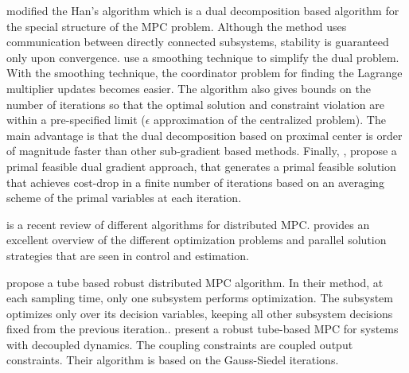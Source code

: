 \documentclass[10pt]{article}
\theoremstyle{definition}
\begin{document}
 \citet{doan:keviczky:necoara:diehl:schutter:2009} modified
the Han's algorithm which is a dual decomposition based algorithm for
the special structure of the MPC problem. Although the method uses
communication between directly connected subsystems, stability is
guaranteed only upon convergence. \citet{necoara:doan:suykens:2008}
use a smoothing technique to simplify the dual problem. With the
smoothing technique, the coordinator problem for finding the Lagrange
multiplier updates becomes easier. The algorithm also gives bounds on
the number of iterations so that the optimal solution and constraint
violation are within a pre-specified limit ($\epsilon$ approximation of
the centralized problem). The main advantage is that the dual
decomposition based on proximal center is order of magnitude faster
than other sub-gradient based methods. Finally,
\citet{doan:keviczky:schutter:2011}, propose a primal feasible dual
gradient approach, that generates a primal feasible solution  that
achieves cost-drop in a
finite number of iterations based on an averaging scheme of the primal
variables at each iteration. 

\citet{christofides:scattolini:pena:liu:2012} is a recent review of different algorithms for distributed
MPC. \citet{necoara:nedelcu:dumitrache:2011} provides an excellent overview of the different
optimization problems and parallel solution strategies that are seen
in control and estimation.

\citet{trodden:richards:2006,trodden:richards:2007} propose a tube based robust distributed
MPC algorithm. In their method, at each sampling time, only one
subsystem performs optimization. The subsystem optimizes only over its
decision variables, keeping all other subsystem decisions fixed from
the previous iteration.. \citet{richards:how:2004} present a robust tube-based
MPC for systems with decoupled dynamics. The coupling constraints are
coupled output constraints. Their algorithm is based on the
Gauss-Siedel iterations.
\end{document}
